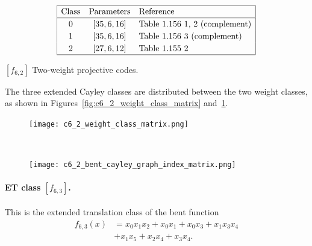 \documentclass[12pt,a4paper]{article}
\begin{document}
\begin{table}[!bhpt] %
\small{
\begin{align*}
\def\arraystretch{1.2}
\begin{array}{|ccl|}
\hline
\text{Class} &
\text{Parameters} & \text{Reference}
\\
\hline
0 & [35,6,16] & \text{Table 1.156 1, 2 (complement)}
\\
1 & [35,6,16] & \text{Table 1.156 3 (complement)}
\\
2 & [27,6,12] & \text{Table 1.155 2 }
\\
\hline
\end{array}
\end{align*}
}
\caption{$[f_{6,2}]$ Two-weight projective codes.}
\label{tab-c6_2_codes}
\end{table}

The three extended Cayley classes are distributed between the two weight classes,
as shown in Figures~\ref{fig:c6_2_weight_class_matrix} and~\ref{fig:c6_2_bent_cayley_graph_index_matrix}.

\begin{figure}[!bhpt] %
\centering
\begin{minipage}{.48\textwidth}
  \centering
  \texttt{[image: c6\_2\_weight\_class\_matrix.png]}
  \label{fig:c6_2_weight_class_matrix}
\end{minipage}%
~~~~
\begin{minipage}{.48\textwidth}
  \centering
  \texttt{[image: c6\_2\_bent\_cayley\_graph\_index\_matrix.png]}
  \label{fig:c6_2_bent_cayley_graph_index_matrix}
\end{minipage}
\end{figure}

%
\paragraph*{ET class $[f_{6,3}]$.}
%
This is the extended translation class of the bent function
\begin{align*}
f_{6,3}(x) &= x_{0} x_{1} x_{2} + x_{0} x_{1} + x_{0} x_{3} + x_{1} x_{3} x_{4}
\\
           &+ x_{1} x_{5} + x_{2} x_{4} + x_{3} x_{4}.
\end{align*}
\end{document}
